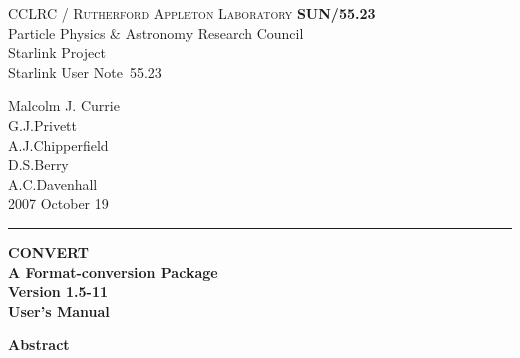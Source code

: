 \documentclass[twoside,11pt]{article}
\newcommand{\stardoccategory}  {Starlink User Note}
\newcommand{\stardocinitials}  {SUN}
\newcommand{\stardocnumber}    {55.23}
\newcommand{\stardocauthors}   {Malcolm J. Currie\\
                                G.J.Privett\\
                                A.J.Chipperfield\\
                                D.S.Berry\\
                                A.C.Davenhall}
\newcommand{\stardocdate}      {2007 October 19}
\newcommand{\stardoctitle}     {CONVERT\\
                                A Format-conversion Package}
\newcommand{\stardocversion}   {Version 1.5-11}
\newcommand{\stardocmanual}    {User's Manual}
\newcommand{\stardocname}{\stardocinitials /\stardocnumber}
\newenvironment{latexonly}{}{}
\begin{document}
\thispagestyle{empty}

\begin{latexonly}
   CCLRC / \textsc{Rutherford Appleton Laboratory} \hfill \textbf{\stardocname}\\
   {\large Particle Physics \& Astronomy Research Council}\\
   {\large Starlink Project\\}
   {\large \stardoccategory\ \stardocnumber}
   \begin{flushright}
   \stardocauthors\\
   \stardocdate
   \end{flushright}
   \vspace{-4mm}
   \rule{\textwidth}{0.5mm}
   \vspace{5mm}
   \begin{center}
   {\Huge\textbf{\stardoctitle \\ [2.5ex]}}
   {\LARGE\textbf{\stardocversion \\ [4ex]}}
   {\Huge\textbf{\stardocmanual}}
   \end{center}
   \vspace{5mm}


   \vspace{10mm}
   \begin{center}
      {\Large\textbf{Abstract}}
   \end{center}
\end{latexonly}
\end{document}
